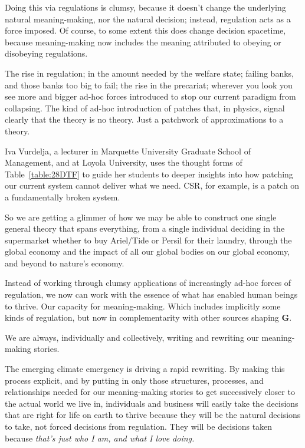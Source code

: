Doing this via regulations is clumsy, because it doesn't change the underlying natural meaning\hyp{}making, nor the natural decision; instead, regulation acts as a force imposed. Of course, to some extent this does change decision spacetime, because meaning\hyp{}making now includes the meaning attributed to obeying or disobeying regulations. 


The rise in regulation; in the amount needed by the welfare state; failing banks, and those banks too big to fail; the rise in the precariat; wherever you look you see more and bigger ad\hyp{}hoc forces introduced to stop our current paradigm from collapsing. The kind of ad\hyp{}hoc introduction of patches that, in physics, signal clearly that the theory is no theory. Just a patchwork of approximations to a theory.


Iva Vurdelja, a lecturer in Marquette University Graduate School of Management, and at Loyola University, uses the thought forms of Table~\ref{table:28DTF} to guide her students to deeper insights into how patching our current system cannot deliver what we need. CSR, for example, is a patch on a fundamentally broken system.  


So we are getting a glimmer of how we may be able to construct one single general theory that spans everything, from a single individual deciding in the supermarket whether to buy Ariel/Tide or Persil for their laundry, through the global economy and the impact of all our global bodies on our global economy, and beyond to nature's economy.


Instead of working through clumsy applications of increasingly ad\hyp{}hoc forces of regulation, we now can work with the essence of what has enabled human beings to thrive. Our capacity for meaning\hyp{}making. Which includes implicitly some kinds of regulation, but now in complementarity with other sources shaping $\mathbf{G}$.


We are always, individually and collectively, writing and rewriting our meaning\hyp{}making stories. 


The emerging climate emergency  is driving a rapid rewriting. By making this process explicit, and by putting in only those structures, processes, and relationships needed for our meaning\hyp{}making stories to get successively closer to the actual world we live in, individuals and business will easily take the decisions that are right for life on earth to thrive because they will be the natural decisions to take, not forced decisions from regulation. They will be decisions taken because \emph{that’s just who I am, and what I love doing.}


